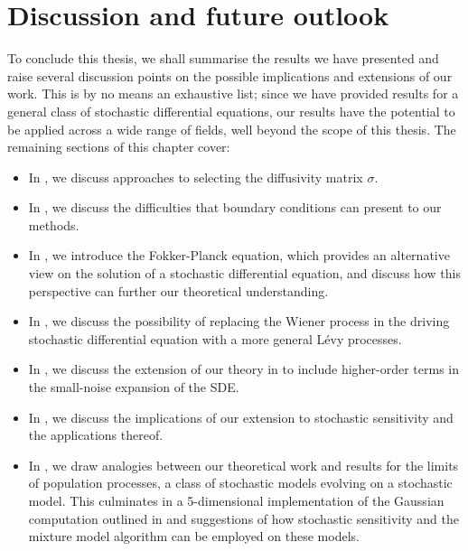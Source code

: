 \chapter{Discussion and future outlook}\label{ch:outlook}
To conclude this thesis, we shall summarise the results we have presented and raise several discussion points on the possible implications and extensions of our work.
This is by no means an exhaustive list; since we have provided results for a general class of stochastic differential equations, our results have the potential to be applied across a wide range of fields, well beyond the scope of this thesis.
The remaining sections of this chapter cover:
\begin{itemize}
	\item In , we discuss approaches to selecting the diffusivity matrix \(\sigma\).
	\item In , we discuss the difficulties that boundary conditions can present to our methods.
	\item In , we introduce the Fokker-Planck equation, which provides an alternative view on the solution of a stochastic differential equation, and discuss how this perspective can further our theoretical understanding.
	\item In , we discuss the possibility of replacing the Wiener process in the driving stochastic differential equation with a more general L\'evy processes.
	\item In , we discuss the extension of our theory in  to include higher-order terms in the small-noise expansion of the SDE.
	\item In , we discuss the implications of our extension to stochastic sensitivity and the applications thereof.
	\item In , we draw analogies between our theoretical work and results for the limits of population processes, a class of stochastic models evolving on a stochastic model.
	      This culminates in a 5-dimensional implementation of the Gaussian computation outlined in  and suggestions of how stochastic sensitivity and the mixture model algorithm can be employed on these models.
\end{itemize}

